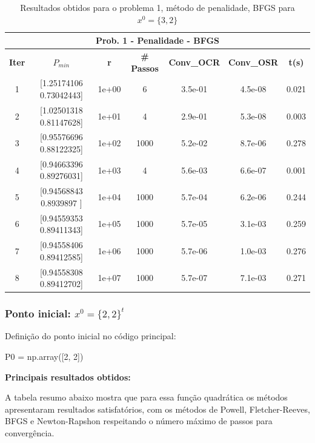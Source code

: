 \documentclass[10pt, a4paper]{article}
\begin{document}
\vspace{5mm}
\begin{table}[H]
  \begin{center}
    \begin{tabular}{c|c|c|c|c|c|c}
      \multicolumn{7}{c}{\textbf{Prob. 1 - Penalidade - BFGS}}\\
      \hline
      \textbf{Iter} & \textbf{$P_{min}$} & \textbf{r} & \textbf{\# Passos} & \textbf{Conv\_OCR} & \textbf{Conv\_OSR} & \textbf{t(s)}\\
      \hline
        1& [1.25174106 0.73042443]& 1e+00& 6& 3.5e-01& 4.5e-08& 0.021      \\
        2& [1.02501318 0.81147628]& 1e+01& 4& 2.9e-01& 5.3e-08& 0.003\\
        3& [0.95576696 0.88122325]& 1e+02& 1000& 5.2e-02& 8.7e-06& 0.278\\
        4& [0.94663396 0.89276031]& 1e+03& 4& 5.6e-03& 6.6e-07& 0.001\\
        5& [0.94568843 0.8939897 ]& 1e+04& 1000& 5.7e-04& 6.2e-06& 0.244\\
        6& [0.94559353 0.89411343]& 1e+05& 1000& 5.7e-05& 3.1e-03& 0.259\\
        7& [0.94558406 0.89412585]& 1e+06& 1000& 5.7e-06& 1.0e-03& 0.276\\
        8& [0.94558308 0.89412702]& 1e+07& 1000& 5.7e-07& 7.1e-03& 0.271\\
    \end{tabular}
  \end{center}
  \caption{Resultados obtidos para o problema 1, método de penalidade, BFGS para $x^0=\{3,2\}$}
\end{table}




\subsubsection{Ponto inicial: $x^0 = \{2,2\}^t $}
Definição do ponto inicial no código principal:
\begin{python}
  P0 = np.array([2, 2])
\end{python}

\vspace{3mm}
\textbf{Principais resultados obtidos: }

\vspace{3mm}
A tabela resumo abaixo mostra que para essa função quadrática os métodos apresentaram resultados satisfatórios,
com os métodos de Powell, Fletcher-Reeves, BFGS e Newton-Rapshon respeitando o número máximo de passos para convergência.
\end{document}
